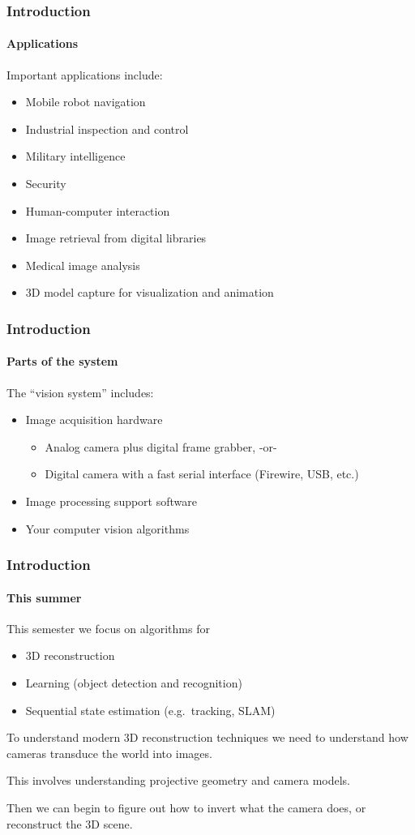 \documentclass[aspectratio=169]{beamer}
\begin{document}
\begin{frame}
\frametitle{Introduction}
\framesubtitle{Applications}

Important applications include:
\begin{itemize}
\item Mobile robot navigation
\item Industrial inspection and control
\item Military intelligence
\item Security
\item Human-computer interaction
\item Image retrieval from digital libraries
\item Medical image analysis
\item 3D model capture for visualization and animation
\end{itemize}

\end{frame}

\begin{frame}
\frametitle{Introduction}
\framesubtitle{Parts of the system}

The ``vision system'' includes:
\begin{itemize}
\item Image \alert{acquisition} hardware
  \begin{itemize}
  \item Analog camera plus digital frame grabber, -or-
  \item Digital camera with a fast serial interface (Firewire, USB,
    etc.)
  \end{itemize}
\item Image processing \alert{support software}
\item Your computer vision \alert{algorithms}
\end{itemize}

\end{frame}

\begin{frame}
\frametitle{Introduction}
\framesubtitle{This summer}

This semester we focus on algorithms for
\begin{itemize}
\item 3D reconstruction
\item Learning (object detection and recognition)
\item Sequential state estimation (e.g.\ tracking, SLAM)
\end{itemize}

\medskip

To understand modern 3D reconstruction techniques we need to
understand how \alert{cameras} transduce the \alert{world} into
\alert{images}.

\medskip

This involves understanding \alert{projective geometry} and
\alert{camera models}.

\medskip

Then we can begin to figure out how to invert what the camera does, or
\alert{reconstruct the 3D scene}.

\end{frame}
\end{document}

